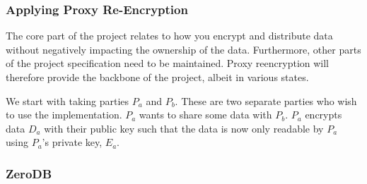 
\subsubsection{Applying Proxy Re-Encryption}

The core part of the project relates to how you encrypt and distribute data without negatively impacting the ownership of the data. Furthermore, other parts of the project specification need to be maintained. Proxy reencryption will therefore provide the backbone of the project, albeit in various states.

We start with taking parties $P_a$ and $P_b$. These are two separate parties who wish to use the implementation. $P_a$ wants to share some data with $P_b$. $P_a$ encrypts data $D_a$ with their public key such that the data is now only readable by $P_a$ using $P_a$'s private key, $E_a$.

\subsubsection{ZeroDB}

